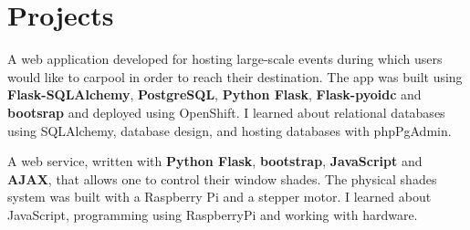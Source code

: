 \documentclass[]{deedy-resume-openfont}
\begin{document}
\begin{minipage}[t]{0.67\textwidth}

\section{Projects}
A web application developed for hosting large-scale events during which users would like to carpool in order to reach their destination.
The app was built using \textbf{Flask-SQLAlchemy}, \textbf{PostgreSQL}, \textbf{Python Flask}, \textbf{Flask-pyoidc} and \textbf{bootsrap} and deployed using OpenShift.
I learned about relational databases using SQLAlchemy, database design, and hosting databases with phpPgAdmin.
\sectionsep


A web service, written with \textbf{Python Flask}, \textbf{bootstrap}, \textbf{JavaScript} and \textbf{AJAX}, that allows one to control their window shades. The physical shades system was built with a Raspberry Pi and a stepper motor. I learned about JavaScript, programming using RaspberryPi and working with hardware.
\sectionsep




\end{minipage}
\end{document}
